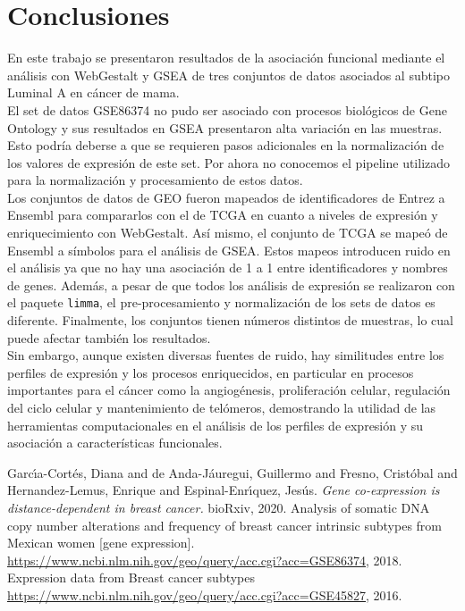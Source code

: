 \documentclass{article}
\begin{document}
\section*{Conclusiones}
En este trabajo se presentaron resultados de la asociación funcional mediante el análisis con WebGestalt y GSEA de tres conjuntos de datos asociados al subtipo Luminal A en cáncer de mama. \\
El set de datos GSE86374 no pudo ser asociado con procesos biológicos de Gene Ontology y sus resultados en GSEA presentaron alta variación en las muestras. Esto podría deberse a que se requieren pasos adicionales en la normalización de los valores de expresión de este set. Por ahora no conocemos el pipeline utilizado para la normalización y procesamiento de estos datos. \\
Los conjuntos de datos de GEO fueron mapeados de identificadores de Entrez a Ensembl para compararlos con el de TCGA en cuanto a niveles de expresión y enriquecimiento con WebGestalt. Así mismo, el conjunto de TCGA se mapeó de Ensembl a símbolos para el análisis de GSEA. Estos mapeos introducen ruido en el análisis ya que no hay una asociación de 1 a 1 entre identificadores y nombres de genes. Además, a pesar de que todos los análisis de expresión se realizaron con el paquete \texttt{limma}, el pre-procesamiento y normalización de los sets de datos es diferente. Finalmente, los conjuntos tienen números distintos de muestras, lo cual puede afectar también los resultados. \\
Sin embargo, aunque existen diversas fuentes de ruido, hay similitudes entre los perfiles de expresión y los procesos enriquecidos, en particular en procesos importantes para el cáncer como la angiogénesis, proliferación celular, regulación del ciclo celular y mantenimiento de telómeros, demostrando la utilidad de las herramientas computacionales en el análisis de los perfiles de expresión y su asociación a características funcionales. 


\begin{thebibliography}{1}

 Garc{\'\i}a-Cort{\'e}s, Diana and de Anda-J{\'a}uregui, Guillermo and Fresno, Crist{\'o}bal and Hernandez-Lemus, Enrique and Espinal-Enr{\'\i}quez, Jes{\'u}s. {\em Gene co-expression is distance-dependent in breast cancer.} bioRxiv, 2020.
 Analysis of somatic DNA copy number alterations and frequency of breast cancer intrinsic subtypes from Mexican women [gene expression]. \url{https://www.ncbi.nlm.nih.gov/geo/query/acc.cgi?acc=GSE86374}, 2018.
 Expression data from Breast cancer subtypes \url{https://www.ncbi.nlm.nih.gov/geo/query/acc.cgi?acc=GSE45827}, 2016.
\end{thebibliography}
\end{document}
